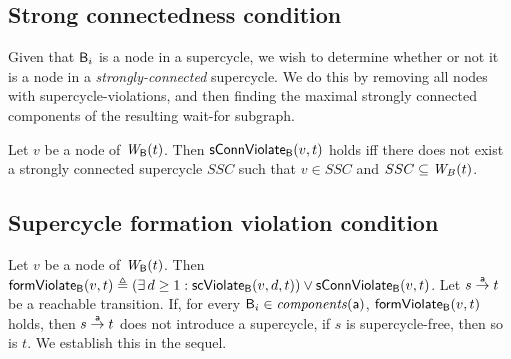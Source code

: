 \subsection{Strong connectedness condition}

Given that $\B_i$ is a node in a supercycle, we wish to determine whether or not it is a node in a
\emph{strongly-connected} supercycle. We do this by removing all nodes with supercycle-violations,
and then finding the maximal strongly connected components of the resulting wait-for subgraph.


\label{def:sConn.violation}
 Let $v$ be a node of $\wfg{\B}{t}$.   Then $\connViol{v}{t}$ holds iff there does not exist a strongly connected
 supercycle $SSC$ such that $v \in SSC$ and $SSC \sub \wfg{B}{t}$.
\ed




\subsection{Supercycle formation violation condition}

\label{def:formation.violation}
Let $v$ be a node of $\wfg{\B}{t}$.
Then $\formViol{v}{t}  \df (\exs d \ge 1: \scViol{v}{d}{t}) \lor \connViol{v}{t}$.
\ed
%
Let $s \goesto[\act] t$ be a reachable transition. If, for every $\B_i \in \cmps{\act}$, 
$\formViol{v}{t}$ holds, then $s \goesto[\act] t$ does not introduce a supercycle, \ie if $s$ is
supercycle-free, then so is $t$. We establish this in the sequel.

